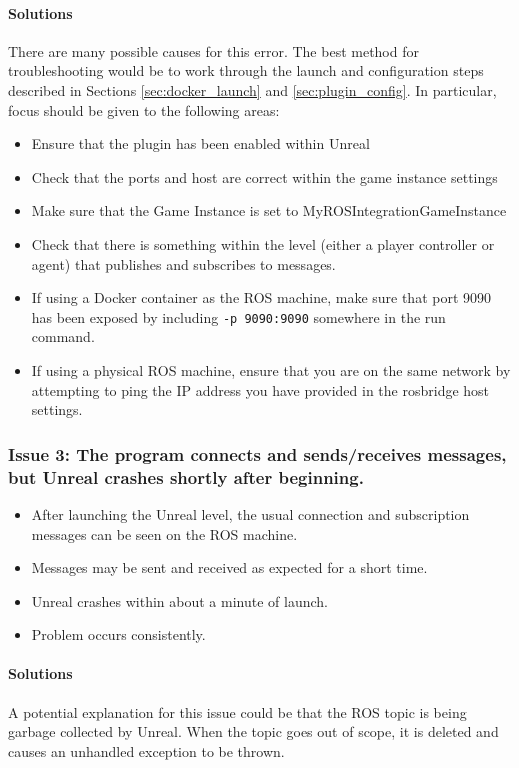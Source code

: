 \documentclass[../main.tex]{subfiles}
\begin{document}
\paragraph{Solutions} There are many possible causes for this error. The best method for troubleshooting would be to work through the launch and configuration steps described in Sections \ref{sec:docker_launch} and \ref{sec:plugin_config}. In particular, focus should be given to the following areas:
\begin{itemize}
    \item Ensure that the plugin has been enabled within Unreal
    \item Check that the ports and host are correct within the game instance settings
    \item Make sure that the Game Instance is set to MyROSIntegrationGameInstance
    \item Check that there is something within the level (either a player controller or agent) that publishes and subscribes to messages.
    \item If using a Docker container as the ROS machine, make sure that port 9090 has been exposed by including \texttt{-p 9090:9090} somewhere in the run command.
    \item If using a physical ROS machine, ensure that you are on the same network by attempting to ping the IP address you have provided in the rosbridge host settings.
\end{itemize}

\subsubsection{Issue 3: The program connects and sends/receives messages, but Unreal crashes shortly after beginning.}
\begin{itemize}
    \item After launching the Unreal level, the usual connection and subscription messages can be seen on the ROS machine.
    \item Messages may be sent and received as expected for a short time.
    \item Unreal crashes within about a minute of launch.
    \item Problem occurs consistently.
\end{itemize}

\paragraph{Solutions} A potential explanation for this issue could be that the ROS topic is being garbage collected by Unreal. When the topic goes out of scope, it is deleted and causes an unhandled exception to be thrown.
\end{document}
